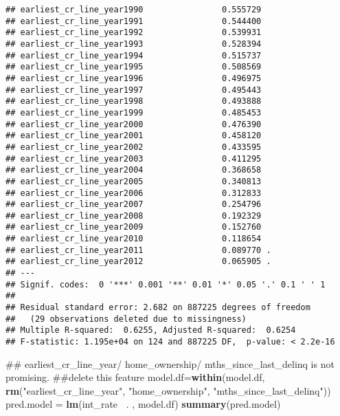\documentclass[]{article}
\newenvironment{Shaded}{\begin{snugshade}}{\end{snugshade}}
\newcommand{\KeywordTok}[1]{\textcolor[rgb]{0.13,0.29,0.53}{\textbf{#1}}}
\newcommand{\StringTok}[1]{\textcolor[rgb]{0.31,0.60,0.02}{#1}}
\newcommand{\OperatorTok}[1]{\textcolor[rgb]{0.81,0.36,0.00}{\textbf{#1}}}
\newcommand{\NormalTok}[1]{#1}
\begin{document}
\begin{verbatim}
## earliest_cr_line_year1990                0.555729    
## earliest_cr_line_year1991                0.544400    
## earliest_cr_line_year1992                0.539931    
## earliest_cr_line_year1993                0.528394    
## earliest_cr_line_year1994                0.515737    
## earliest_cr_line_year1995                0.508569    
## earliest_cr_line_year1996                0.496975    
## earliest_cr_line_year1997                0.495443    
## earliest_cr_line_year1998                0.493888    
## earliest_cr_line_year1999                0.485453    
## earliest_cr_line_year2000                0.476390    
## earliest_cr_line_year2001                0.458120    
## earliest_cr_line_year2002                0.433595    
## earliest_cr_line_year2003                0.411295    
## earliest_cr_line_year2004                0.368658    
## earliest_cr_line_year2005                0.340813    
## earliest_cr_line_year2006                0.312833    
## earliest_cr_line_year2007                0.254796    
## earliest_cr_line_year2008                0.192329    
## earliest_cr_line_year2009                0.152760    
## earliest_cr_line_year2010                0.118654    
## earliest_cr_line_year2011                0.089770 .  
## earliest_cr_line_year2012                0.065905 .  
## ---
## Signif. codes:  0 '***' 0.001 '**' 0.01 '*' 0.05 '.' 0.1 ' ' 1
## 
## Residual standard error: 2.682 on 887225 degrees of freedom
##   (29 observations deleted due to missingness)
## Multiple R-squared:  0.6255, Adjusted R-squared:  0.6254 
## F-statistic: 1.195e+04 on 124 and 887225 DF,  p-value: < 2.2e-16
\end{verbatim}

\begin{Shaded}
\begin{Highlighting}[]
\NormalTok{## earliest_cr_line_year/ home_ownership/ mths_since_last_delinq is not promising. ##delete this feature}
\NormalTok{model.df=}\KeywordTok{within}\NormalTok{(model.df, }\KeywordTok{rm}\NormalTok{(}\StringTok{"earliest_cr_line_year"}\NormalTok{, }\StringTok{"home_ownership"}\NormalTok{, }\StringTok{"mths_since_last_delinq"}\NormalTok{))}
\NormalTok{pred.model =}\StringTok{ }\KeywordTok{lm}\NormalTok{(int_rate }\OperatorTok{~}\NormalTok{. , model.df)}
\KeywordTok{summary}\NormalTok{(pred.model)}
\end{Highlighting}
\end{Shaded}
\end{document}
